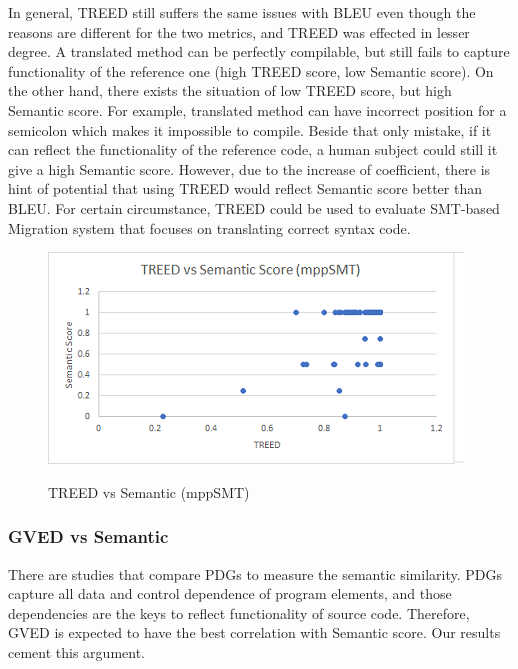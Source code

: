 
In general, TREED still suffers the same issues with BLEU even though the reasons are different for the two metrics, and TREED was effected in lesser degree. A translated method can be perfectly compilable, but still fails to capture functionality of the reference one (high TREED score, low Semantic score). On the other hand, there exists the situation of low TREED score, but high Semantic score. For example, translated method can have incorrect position for a semicolon which makes it impossible to compile. Beside that only mistake, if it can reflect the functionality of the reference code, a human subject could still it give a high Semantic score. However, due to the increase of coefficient, there is hint of potential that using TREED would reflect Semantic score better than BLEU. For certain circumstance, TREED could be used to evaluate SMT-based Migration system that focuses on translating correct syntax code. 

%
\begin{figure}
\caption{TREED vs Semantic (mppSMT)}
\centering
\includegraphics{img/treed_mppSMT.png}
\label{fig:TREEDmppSMT}
\end{figure}

\subsubsection{\textbf{GVED vs Semantic}}
There are studies that compare PDGs to measure the semantic similarity. PDGs capture all data and control dependence of program elements, and those dependencies are the keys to reflect functionality of source code. Therefore, GVED is expected to have the best correlation with Semantic score. Our results cement this argument. 

